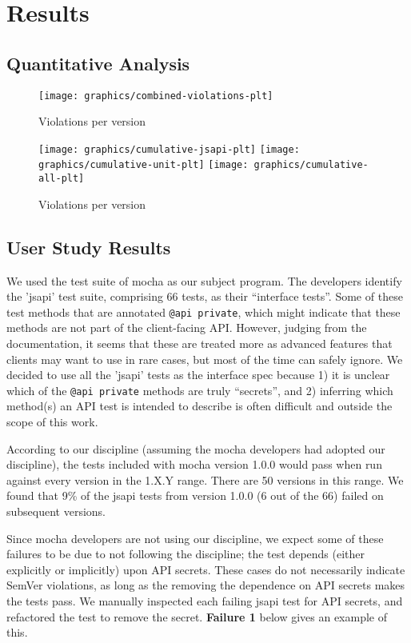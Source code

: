\section{Results}

\subsection{Quantitative Analysis}

\begin{figure*}
\centering
\texttt{[image: graphics/combined-violations-plt]}
\caption{Violations per version}
\end{figure*}

\begin{figure*}
\centering
\texttt{[image: graphics/cumulative-jsapi-plt]}
\texttt{[image: graphics/cumulative-unit-plt]}
\texttt{[image: graphics/cumulative-all-plt]}
\caption{Violations per version}
\end{figure*}

\subsection{User Study Results}
We used the test suite of mocha as our subject program. The developers
identify the 'jsapi' test suite, comprising 66 tests, as their
``interface tests''. Some of these test methods that are annotated
{\tt @api private}, which might indicate that these methods are not
part of the client-facing API. However, judging from the
documentation, it seems that these are treated more as advanced
features that clients may want to use in rare cases, but most of the
time can safely ignore. We decided to use all the 'jsapi' tests as the
interface spec because 1) it is unclear which of the {\tt @api
  private} methods are truly ``secrets'', and 2) inferring which
method(s) an API test is intended to describe is often difficult and
outside the scope of this work.

According to our discipline (assuming the mocha developers had adopted
our discipline), the tests included with mocha version 1.0.0 would
pass when run against every version in the 1.X.Y range. There are 50
versions in this range. We found that 9\% of the jsapi tests from
version 1.0.0 (6 out of the 66) failed on subsequent versions.

Since mocha developers are not using our discipline, we expect some of
these failures to be due to not following the discipline; the test
depends (either explicitly or implicitly) upon API secrets. These
cases do not necessarily indicate SemVer violations, as long as the
removing the dependence on API secrets makes the tests pass. We
manually inspected each failing jsapi test for API secrets, and
refactored the test to remove the secret. {\bf Failure 1} below gives
an example of this.


